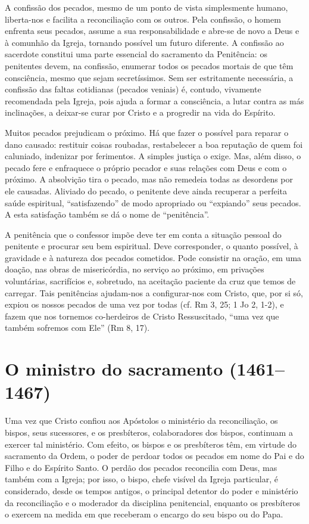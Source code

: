 A confissão dos pecados, mesmo de um ponto de vista simplesmente humano, liberta-nos e facilita a reconciliação com os outros. Pela confissão, o homem enfrenta seus pecados, assume a sua responsabilidade e abre-se de novo a Deus e à comunhão da Igreja, tornando possível um futuro diferente. A confissão ao sacerdote constitui uma parte essencial do sacramento da Penitência: os penitentes devem, na confissão, enumerar todos os pecados mortais de que têm consciência, mesmo que sejam secretíssimos. Sem ser estritamente necessária, a confissão das faltas cotidianas (pecados veniais) é, contudo, vivamente recomendada pela Igreja, pois ajuda a formar a consciência, a lutar contra as más inclinações, a deixar-se curar por Cristo e a progredir na vida do Espírito.

Muitos pecados prejudicam o próximo. Há que fazer o possível para reparar o dano causado: restituir coisas roubadas, restabelecer a boa reputação de quem foi caluniado, indenizar por ferimentos. A simples justiça o exige. Mas, além disso, o pecado fere e enfraquece o próprio pecador e suas relações com Deus e com o próximo. A absolvição tira o pecado, mas não remedeia todas as desordens por ele causadas. Aliviado do pecado, o penitente deve ainda recuperar a perfeita saúde espiritual, ``satisfazendo'' de modo apropriado ou ``expiando'' seus pecados. A esta satisfação também se dá o nome de ``penitência''.

A penitência que o confessor impõe deve ter em conta a situação pessoal do penitente e procurar seu bem espiritual. Deve corresponder, o quanto possível, à gravidade e à natureza dos pecados cometidos. Pode consistir na oração, em uma doação, nas obras de misericórdia, no serviço ao próximo, em privações voluntárias, sacrifícios e, sobretudo, na aceitação paciente da cruz que temos de carregar. Tais penitências ajudam-nos a configurar-nos com Cristo, que, por si só, expiou os nossos pecados de uma vez por todas (cf. Rm 3, 25; 1 Jo 2, 1-2), e fazem que nos tornemos co-herdeiros de Cristo Ressuscitado, ``uma vez que também sofremos com Ele'' (Rm 8, 17).

\section{O ministro do sacramento (1461--1467)}

Uma vez que Cristo confiou aos Apóstolos o ministério da reconciliação, os bispos, seus sucessores, e os presbíteros, colaboradores dos bispos, continuam a exercer tal ministério. Com efeito, os bispos e os presbíteros têm, em virtude do sacramento da Ordem, o poder de perdoar todos os pecados em nome do Pai e do Filho e do Espírito Santo. O perdão dos pecados reconcilia com Deus, mas também com a Igreja; por isso, o bispo, chefe visível da Igreja particular, é considerado, desde os tempos antigos, o principal detentor do poder e ministério da reconciliação e o moderador da disciplina penitencial, enquanto os presbíteros o exercem na medida em que receberam o encargo do seu bispo ou do Papa.

